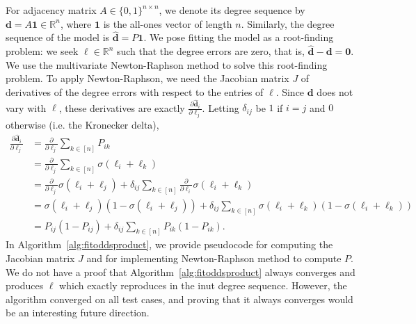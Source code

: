 For adjacency matrix $A \in \{0,1\}^{n \times n}$, we denote its degree sequence by $\bm{d} = A \bm{1} \in \mathbb{R}^n$, where $\bm{1}$ is the all-ones vector of length $n$. Similarly, the degree sequence of the model is $\bm{\hat{d}} = P \bm{1}$. We pose fitting the model as a root-finding problem: we seek $\bm{\ell} \in \mathbb{R}^n$ such that the degree errors are zero, that is, $\bm{\hat{d}} - \bm{d} = \bm{0}$. We use the multivariate Newton-Raphson method to solve this root-finding problem. To apply Newton-Raphson, we need the Jacobian matrix $J$ of derivatives of the degree errors with respect to the entries of $\bm{\ell}$. Since $\bm{d}$ does not vary with $\bm{\ell}$, these derivatives are exactly $\tfrac{\partial \bm{\hat{d}}_i}{\partial \bm{\ell}_j}$.
Letting $\delta_{ij}$ be $1$ if $i=j$ and $0$ otherwise (i.e. the Kronecker delta),
%
\begin{align*}
\tfrac{\partial \bm{\hat{d}}_i}{\partial \bm{\ell}_j}
&= \tfrac{\partial}{\partial \bm{\ell}_j} \sum\nolimits_{k \in [n]} P_{ik} \\
&= \tfrac{\partial}{\partial \bm{\ell}_j} \sum\nolimits_{k \in [n]} \sigma(\bm{\ell}_i + \bm{\ell}_k) \\
&= \tfrac{\partial}{\partial \bm{\ell}_j} \sigma(\bm{\ell}_i + \bm{\ell}_j) + \delta_{ij} \sum\nolimits_{k \in [n]} \tfrac{\partial}{\partial \bm{\ell}_i} \sigma(\bm{\ell}_i + \bm{\ell}_k) \\
&= \sigma(\bm{\ell}_i + \bm{\ell}_j) \left( 1 - \sigma(\bm{\ell}_i + \bm{\ell}_j) \right) + \delta_{ij} \sum\nolimits_{k \in [n]} \sigma(\bm{\ell}_i + \bm{\ell}_k) \left( 1 - \sigma(\bm{\ell}_i + \bm{\ell}_k) \right) \\
&= P_{ij} \left( 1 - P_{ij} \right) + \delta_{ij} \sum\nolimits_{k \in [n]} P_{ik} \left( 1 - P_{ik} \right) .
\end{align*}
%
In Algorithm~\ref{alg:fitoddsproduct}, we provide pseudocode for computing the Jacobian matrix $J$ %
and for implementing Newton-Raphson method to compute $P$. We do not have a proof that Algorithm~\ref{alg:fitoddsproduct} always converges and produces $\bm{\ell}$ which exactly reproduces in the inut degree sequence. However, the algorithm converged on all test cases, and proving that it always converges would be an interesting future direction.

